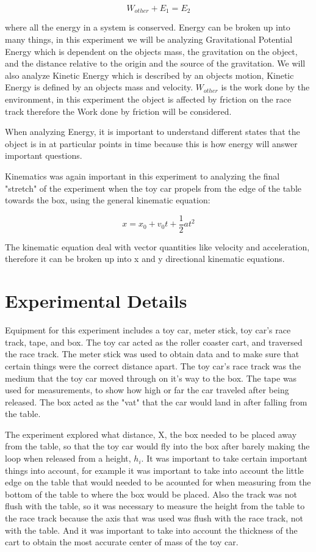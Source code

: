 \documentclass[aps,letterpaper,11pt]{revtex4}
\begin{document}
$$ W_{other} + E_1 = E_2$$

where all the energy in a system is conserved. Energy can be broken up into many things, in this experiment we will be analyzing Gravitational Potential Energy which is dependent on the objects mass, the gravitation on the object, and the distance relative to the origin and the source of the gravitation. We will also analyze Kinetic Energy which is described by an objects motion, Kinetic Energy is defined by an objects mass and velocity. $W_{other}$ is the work done by the environment, in this experiment the object is affected by friction on the race track therefore the Work done by friction will be considered. 

When analyzing Energy, it is important to understand different states that the object is in at particular points in time because this is how energy will answer important questions. 

Kinematics was again important in this experiment to analyzing the final "stretch" of the experiment when the toy car propels from the edge of the table towards the box, using the general kinematic equation:

$$ x = x_0 + v_0t + \frac{1}{2}at^2$$

The kinematic equation deal with vector quantities like velocity and acceleration, therefore it can be broken up into x and y directional kinematic equations. 

\section{Experimental Details}

Equipment for this experiment includes a toy car, meter stick, toy car's race track, tape, and box. The toy car acted as the roller coaster cart, and traversed the race track. The meter stick was used to obtain data and to make sure that certain things were the correct distance apart.  The toy car's race track was the medium that the toy car moved through on it's way to the box. The tape was used for measurements, to show how high or far the car traveled after being released. The box acted as the "vat" that the car would land in after falling from the table. 

The experiment explored what distance, X, the box needed to be placed away from the table, so that the toy car would fly into the box after barely making the loop when released from a height, $h_i$. It was important to take certain important things into account, for example it was important to take into account the little edge on the table that would needed to be acounted for when measuring from the bottom of the table to where the box would be placed. Also the track was not flush with the table, so it was necessary to measure the height from the table to the race track because the axis that was used was flush with the race track, not with the table. And it was important to take into account the thickness of the cart to obtain the most accurate center of mass of the toy car. 
\end{document}
